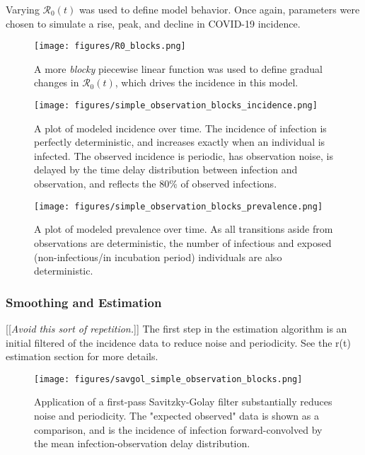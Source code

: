 \documentclass{article}
\newcommand{\nR}{\mathcal{R}}
\newcommand{\jd}[1]{[[\textsl{#1}]]}
\begin{document}
{Varying $\nR_0(t)$ was used to define model behavior. Once again, parameters were chosen to simulate a rise, peak, and decline in COVID-19 incidence.

\begin{figure}[h!]
\centering
\texttt{[image: figures/R0\_blocks.png]}
\caption{A more \emph{blocky} piecewise linear function was used to define gradual changes in $\nR_0(t)$, which drives the incidence in this model.}

\end{figure}

\clearpage
\begin{figure}[h!]
\centering
\texttt{[image: figures/simple\_observation\_blocks\_incidence.png]}
\caption{A plot of modeled incidence over time. The incidence of infection is perfectly deterministic, and increases exactly when an individual is infected. The observed incidence is periodic, has observation noise, is delayed by the time delay distribution between infection and observation, and reflects the 80\% of observed infections.}
\end{figure}

\begin{figure}[h!]
\centering
\texttt{[image: figures/simple\_observation\_blocks\_prevalence.png]}
\caption{A plot of modeled prevalence over time. As all transitions aside from observations are deterministic, the number of infectious and exposed (non-infectious/in incubation period) individuals are also deterministic.}
\end{figure}

\subsubsection{Smoothing and Estimation}

\jd{Avoid this sort of repetition.}
The first step in the estimation algorithm is an initial filtered of the incidence data to reduce noise and periodicity. See the r(t) estimation section for more details.

\begin{figure}[h!]
\centering
\texttt{[image: figures/savgol\_simple\_observation\_blocks.png]}
\caption{Application of a first-pass Savitzky-Golay filter substantially reduces noise and periodicity. The "expected observed" data is shown as a comparison, and is the incidence of infection forward-convolved by the mean infection-observation delay distribution.}
\label{SGnoCIBlocks}
\end{figure}

}
\end{document}
